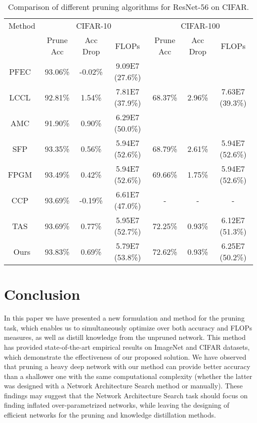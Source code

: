 \documentclass{article}
\begin{document}
\begin{table}[t]
  \caption{
  Comparison of different pruning algorithms for ResNet-56 on CIFAR.
}
  \centering
  \setlength{\tabcolsep}{4.5pt}
  \begin{tabular}{c c c c c c c}
    \toprule
\multirow{1}{*}{Method} &       \multicolumn{3}{c}{CIFAR-10}       & \multicolumn{3}{c}{CIFAR-100}            \\
                                                   & Prune Acc  & Acc Drop  &   FLOPs          & Prune Acc   & Acc Drop  &  FLOPs           \\
    \midrule
PFEC~\cite{PFEC}&  93.06\%   & -0.02\%   & 9.09E7 (27.6\%) &         &        &              \\
                          LCCL~\cite{LCCL} &  92.81\%   & 1.54\%    & 7.81E7 (37.9\%) &  68.37\%   &   2.96\%  &  7.63E7 (39.3\%) \\
                           AMC~\cite{AMC}    &  91.90\%   & 0.90\%    & 6.29E7 (50.0\%) &         &        &              \\
                           SFP~\cite{SFP}   &  93.35\%   & 0.56\%    & 5.94E7 (52.6\%) &  68.79\%   &   2.61\%  &  5.94E7 (52.6\%) \\
                          FPGM~\cite{FPGM}&  93.49\%   & 0.42\%    & 5.94E7 (52.6\%) &  69.66\%   &   1.75\%  &  5.94E7 (52.6\%) \\
                           CCP~\cite{CCP}  &  93.69\%   & -0.19\%    & 6.61E7 (47.0\%) &  -   &   -  &  -  \\
                           TAS~\cite{TAS}                 &  93.69\%   & 0.77\%    & 5.95E7 (52.7\%) &  72.25\%   &   0.93\%  &  6.12E7 (51.3\%)  \\
                           \midrule
                          Ours &  {93.83\%}   & 0.69\%    & {5.79E7 (53.8\%)} &  {72.62\%}   &   {0.93\%}  &  6.25E7 (50.2\%) \\
    \bottomrule
  \end{tabular}
  \label{table:CIFAR-SOTA}
\end{table}
\section{Conclusion}
\vspace{-10pt}
In this paper we have presented a new formulation and method for the pruning task, which enables us to simultaneously optimize over both accuracy and FLOPs measures, as well as distill knowledge from the unpruned network. This method has provided state-of-the-art empirical results on ImageNet and CIFAR datasets, which demonstrate the effectiveness of our proposed solution. 
We have observed that pruning a heavy deep network with our method can provide better accuracy than a shallower one with the same computational complexity (whether the latter was designed with a Network Architecture Search method or manually). 
These findings may suggest that the Network Architecture Search task should focus on finding inflated over-parametrized networks, while leaving the designing of efficient networks for the pruning and knowledge distillation methods.
\end{document}
